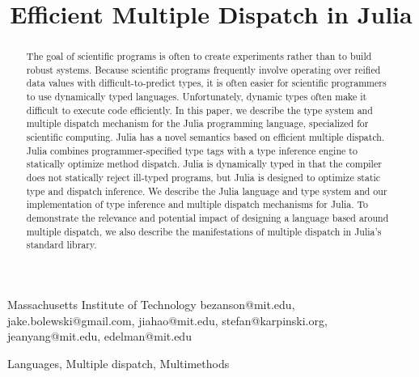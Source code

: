 \documentclass[pldi]{sigplanconf-pldi15}
\begin{document}


\title{Efficient Multiple Dispatch in Julia}

	{Massachusetts Institute of Technology}
	{bezanson@mit.edu, jake.bolewski@gmail.com, jiahao@mit.edu, stefan@karpinski.org, jeanyang@mit.edu, edelman@mit.edu}

\maketitle

\begin{abstract}
The goal of scientific programs is often to create experiments rather than to
build robust systems. Because scientific programs frequently involve operating
over reified data values with difficult-to-predict types, it is often easier
for scientific programmers to use dynamically typed languages. Unfortunately,
dynamic types often make it difficult to execute code efficiently. In this
paper, we describe the type system and multiple dispatch mechanism for the
Julia programming language, specialized for scientific computing. Julia has a
novel semantics based on efficient multiple dispatch. Julia combines
programmer-specified type tags with a type inference engine to statically
optimize method dispatch. Julia is dynamically typed in that the compiler does
not statically reject ill-typed programs, but Julia is designed to optimize
static type and dispatch inference. We describe the Julia language and type
system and our implementation of type inference and multiple dispatch
mechanisms for Julia. To demonstrate the relevance and potential impact of
designing a language based around multiple dispatch, we also describe the
manifestations of multiple dispatch in Julia's standard library.
\end{abstract}


\terms Languages, Multiple dispatch, Multimethods

\end{document}
